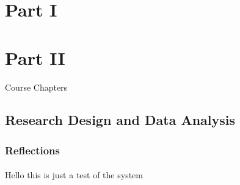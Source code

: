 \documentclass[12pt,titlepage]{article}
\begin{document}
\maketitle
\tableofcontents

\section{Part I}





\section{Part II}{Course Chapters}
\subsection{Research Design and Data Analysis}
\subsubsection{Reflections}

\paragraph{}
Hello this is just a test of the system





\end{document}
